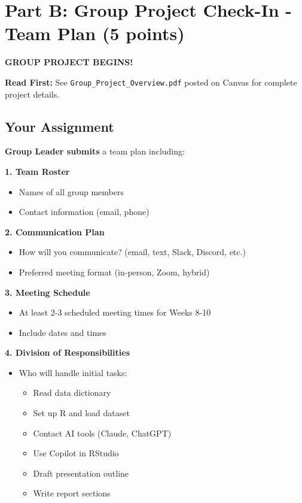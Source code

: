 \documentclass[10pt]{article}
\begin{document}
\newpage

\section*{Part B: Group Project Check-In - Team Plan (5 points)}

\begin{tcolorbox}[colback=aiblue!10,colframe=aiblue,boxrule=1pt,arc=2pt,left=6pt,right=6pt,top=6pt,bottom=6pt]
\textbf{GROUP PROJECT BEGINS!}
\end{tcolorbox}

\vspace{4pt}

\textbf{Read First:} See \texttt{Group\_Project\_Overview.pdf} posted on Canvas for complete project details.

\subsection*{Your Assignment}

\textbf{Group Leader submits} a team plan including:

\textbf{1. Team Roster}
\begin{itemize}[leftmargin=20pt]
\item Names of all group members
\item Contact information (email, phone)
\end{itemize}

\textbf{2. Communication Plan}
\begin{itemize}[leftmargin=20pt]
\item How will you communicate? (email, text, Slack, Discord, etc.)
\item Preferred meeting format (in-person, Zoom, hybrid)
\end{itemize}

\textbf{3. Meeting Schedule}
\begin{itemize}[leftmargin=20pt]
\item At least 2-3 scheduled meeting times for Weeks 8-10
\item Include dates and times
\end{itemize}

\textbf{4. Division of Responsibilities}
\begin{itemize}[leftmargin=20pt]
\item Who will handle initial tasks:
\begin{itemize}[leftmargin=15pt]
\item Read data dictionary
\item Set up R and load dataset
\item Contact AI tools (Claude, ChatGPT)
\item Use Copilot in RStudio
\item Draft presentation outline
\item Write report sections
\end{itemize}
\end{itemize}
\end{document}
